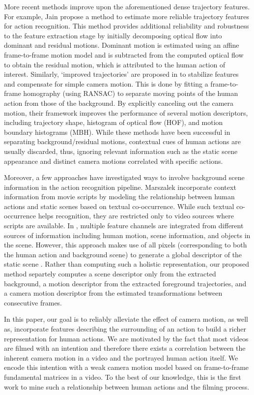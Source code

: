 More recent methods improve upon the aforementioned dense trajectory features. For example, Jain \etal \cite{jain2013} propose a method to estimate more reliable trajectory features for action recognition. This method provides additional reliability and robustness to the feature extraction stage by initially decomposing optical flow into dominant and residual motions. Dominant motion is estimated using an affine frame-to-frame motion model and is subtracted from the computed optical flow to obtain the residual motion, which is attributed to the human action of interest. Similarly, `improved trajectories' are proposed in \cite{wang2013} to stabilize features and compensate for simple camera motion. This is done by fitting a frame-to-frame homography (using RANSAC) to separate moving points of the human action from those of the background. By explicitly canceling out the camera motion, their framework improves the performance of several motion descriptors, including trajectory shape, histogram of optical flow (HOF), and motion boundary histograms (MBH). While these methods have been successful in separating background/residual motions, contextual cues of human actions are usually discarded, thus, ignoring relevant information such as the static scene appearance and distinct camera motions correlated with specific actions.

Moreover, a few approaches have investigated ways to involve background scene information in the action recognition pipeline. Marszalek \etal \cite{marszalek2009} incorporate context information from movie scripts by modeling the relationship between human actions and static scenes based on textual co-occurrence. While such textual co-occurrence helps recognition, they are restricted only to video sources where scripts are available. In \cite{ikizler2010}, multiple feature channels are integrated from different sources of information including human motion, scene information, and objects in the scene. However, this approach makes use of all pixels (corresponding to both the human action and background scene) to generate a global descriptor of the static scene \cite{oliva2001}. Rather than computing such a holistic representation, our proposed method separtely computes a scene descriptor only from the extracted background, a motion descriptor from the extracted foreground trajectories, and a camera motion descriptor from the estimated transformations between consecutive frames.

In this paper, our goal is to reliably alleviate the effect of camera motion, as well as, incorporate features describing the surrounding of an action to build a richer representation for human actions. We are motivated by the fact that most videos are filmed with an intention and therefore there exists a correlation between the inherent camera motion in a video and the portrayed human action itself. We encode this intention with a weak camera motion model based on frame-to-frame fundamental matrices in a video. To the best of our knowledge, this is the first work to mine such a relationship between human actions and the filming process.








